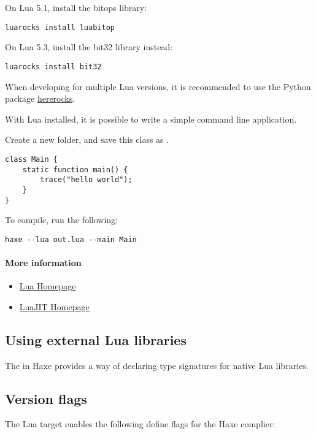On Lua 5.1, install the bitops library:
\begin{lstlisting}
luarocks install luabitop
\end{lstlisting}

On Lua 5.3, install the bit32 library instead:
\begin{lstlisting}
luarocks install bit32
\end{lstlisting}

When developing for multiple Lua versions, it is recommended to use
the Python package \href{https://github.com/mpeterv/hererocks}{hererocks}.

With Lua installed, it is possible to write a simple command line application.

Create a new folder, and save this class as .

\begin{lstlisting}
class Main {
    static function main() {
        trace("hello world");
    }
}
\end{lstlisting}

To compile, run the following:
\begin{lstlisting}
haxe --lua out.lua --main Main
\end{lstlisting}

\paragraph{More information}
\begin{itemize}
	\item \href{https://www.lua.org/}{Lua Homepage}
	\item \href{http://luajit.org/}{LuaJIT Homepage}
\end{itemize}

\subsection{Using external Lua libraries}
\label{target-lua-external-libraries}

The  in Haxe provides a way of declaring type signatures
for native Lua libraries.

\subsection{Version flags}
\label{target-lua-flags}

The Lua target enables the following define flags for the Haxe complier:

